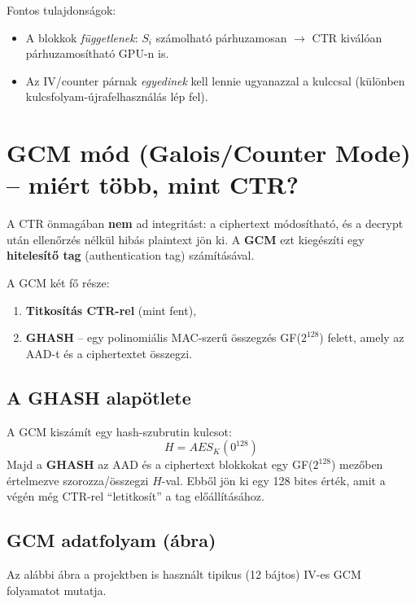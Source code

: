 Fontos tulajdonságok:
\begin{itemize}
  \item A blokkok \emph{függetlenek}: $S_i$ számolható párhuzamosan $\rightarrow$ CTR kiválóan párhuzamosítható GPU-n is.
  \item Az IV/counter párnak \emph{egyedinek} kell lennie ugyanazzal a kulccsal (különben kulcsfolyam-újrafelhasználás lép fel).
\end{itemize}

\section{GCM mód (Galois/Counter Mode) -- miért több, mint CTR?}

A CTR önmagában \textbf{nem} ad integritást: a ciphertext módosítható, és a decrypt után
ellenőrzés nélkül hibás plaintext jön ki. A \textbf{GCM} ezt kiegészíti egy
\textbf{hitelesítő tag} (authentication tag) számításával.

A GCM két fő része:
\begin{enumerate}
  \item \textbf{Titkosítás CTR-rel} (mint fent),
  \item \textbf{GHASH} -- egy polinomiális MAC-szerű összegzés GF($2^{128}$) felett, amely az AAD-t és a ciphertextet összegzi.
\end{enumerate}

\subsection{A GHASH alapötlete}

A GCM kiszámít egy hash-szubrutin kulcsot:
\[
H = AES_K(0^{128})
\]
Majd a \textbf{GHASH} az AAD és a ciphertext blokkokat egy GF($2^{128}$) mezőben értelmezve
szorozza/összegzi $H$-val. Ebből jön ki egy 128 bites érték, amit a végén még CTR-rel
``letitkosít'' a tag előállításához.

\subsection{GCM adatfolyam (ábra)}

Az alábbi ábra a projektben is használt tipikus (12 bájtos) IV-es GCM folyamatot mutatja.

